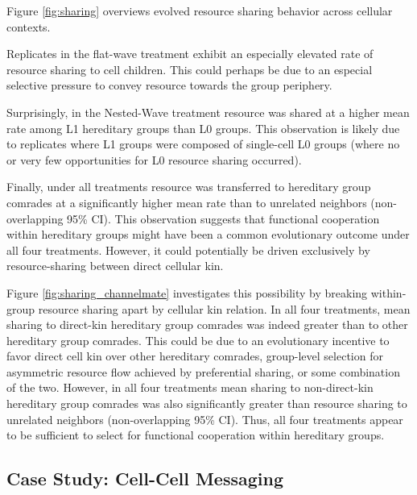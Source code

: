 


Figure \ref{fig:sharing} overviews evolved resource sharing behavior across cellular contexts.

Replicates in the flat-wave treatment exhibit an especially elevated rate of resource sharing to cell children.
This could perhaps be due to an especial selective pressure to convey resource towards the group periphery.

Surprisingly, in the Nested-Wave treatment resource was shared at a higher mean rate among L1 hereditary groups than L0 groups.
This observation is likely due to replicates where L1 groups were composed of single-cell L0 groups (where no or very few opportunities for L0 resource sharing occurred).

Finally, under all treatments resource was transferred to hereditary group comrades at a significantly higher mean rate than to unrelated neighbors (non-overlapping 95\% CI).
This observation suggests that functional cooperation within hereditary groups might have been a common evolutionary outcome under all four treatments.
However, it could potentially be driven exclusively by resource-sharing between direct cellular kin.

Figure \ref{fig:sharing_channelmate} investigates this possibility by breaking within-group resource sharing apart by cellular kin relation.
In all four treatments, mean sharing to direct-kin hereditary group comrades was indeed greater than to other hereditary group comrades.
This could be due to an evolutionary incentive to favor direct cell kin over other hereditary comrades, group-level selection for asymmetric resource flow achieved by preferential sharing, or some combination of the two.
However, in all four treatments mean sharing to non-direct-kin hereditary group comrades was also significantly greater than resource sharing to unrelated neighbors (non-overlapping 95\% CI).
Thus, all four treatments appear to be sufficient to select for functional cooperation within hereditary groups.

\subsection{Case Study: Cell-Cell Messaging} \label{sec:intergroup}



